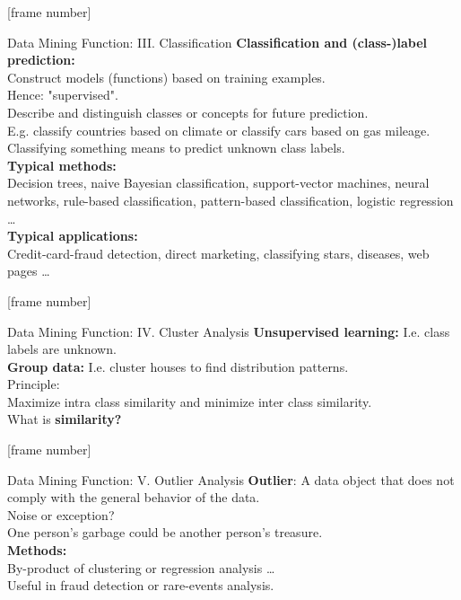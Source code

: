\documentclass[aspectratio=169,t]{beamer}
\begin{document}
  {
    [frame number]
    \begin{frame}{Data Mining Function: III. Classification}
    \textbf{Classification and (class-)label prediction:}\\
    Construct models (functions) based on training examples. \\
    Hence: "supervised".\\
    Describe and distinguish classes or concepts for future prediction.\\
    E.g. classify countries based on climate or classify cars based on gas mileage.\\
    Classifying something means to predict unknown class labels. \\[0.5cm]

    \textbf{Typical methods:}\\
    Decision trees, naive Bayesian classification, support-vector machines, neural networks, rule-based classification, pattern-based classification, logistic regression \ldots\\[0.5cm]

    \textbf{Typical applications:}\\
    Credit-card-fraud detection, direct marketing, classifying stars, diseases, web pages \ldots
    \end{frame}
  }

  {
    [frame number]
    \begin{frame}{Data Mining Function: IV. Cluster Analysis}
    \textbf{Unsupervised learning:} I.e. class labels are unknown.\\
    \textbf{Group data:} I.e. cluster houses to find distribution patterns.\\[0.5cm]

    Principle:\\
    Maximize intra class similarity and minimize inter class similarity.\\[0.5cm]

    What is \textbf{similarity?}
    \end{frame}
  }

  {
    [frame number]
    \begin{frame}{Data Mining Function: V. Outlier Analysis}
    \textbf{Outlier}: A data object that does not comply with the general behavior of the data.\\[0.5cm]

    Noise or exception?\\
    One person's garbage could be another person's treasure.\\[0.5cm]

    \textbf{Methods:}\\
    By-product of clustering or regression analysis \ldots \\
    Useful in fraud detection or rare-events analysis.
    \end{frame}
  }
\end{document}
